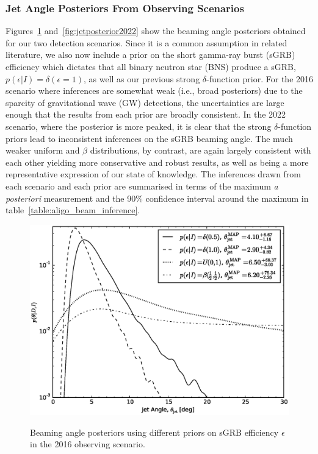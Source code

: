\documentclass[twocolumn,nofootinbib]{revtex4-1}
\def\bns#1{binary neutron star#1 (BNS#1)\gdef\bns{BNS}}
\def\gw#1{gravitational wave#1 (GW#1)\gdef\gw{GW}}
\def\sgrb#1{short gamma-ray burst#1 (sGRB#1)\gdef\sgrb{sGRB}}
\begin{document}
\subsubsection{Jet Angle Posteriors From Observing Scenarios}
Figures~\ref{fig:jetposterior2016} and~\ref{fig:jetposterior2022} show the
beaming angle posteriors obtained for our two detection scenarios.  Since it is
a common assumption in related literature, we also now include a prior on the
\sgrb{} efficiency which dictates that all \bns{} produce a \sgrb{},
$p(\epsilon|I)=\delta(\epsilon=1)$, as well as our previous strong
$\delta$-function prior.  For the 2016 scenario where inferences are somewhat
weak (i.e., broad posteriors) due to the sparcity of \gw{} detections, the
uncertainties are large enough that the results from each prior are broadly
consistent.  In the 2022 scenario, where the posterior is more peaked, it is
clear that the strong $\delta$-function priors lead to inconsistent inferences
on the \sgrb{} beaming angle.  The much weaker uniform and $\beta$
distributions, by contrast, are again largely consistent with each other
yielding more conservative and robust results, as well as being a more
representative expression of our state of knowledge.  The inferences drawn from
each scenario and each prior are summarised in terms of the maximum \emph{a
posteriori} measurement and the 90\% confidence interval around the maximum in
table~\ref{table:aligo_beam_inference}.

\begin{figure}
\centering
{\includegraphics[width=\linewidth]{jet_angle_posterior_aligo_2016_re_real.eps}}
\caption{Beaming angle posteriors using different priors on \sgrb{} efficiency
$\epsilon$ in the 2016 observing scenario.\label{fig:jetposterior2016}}
\end{figure}
\end{document}
